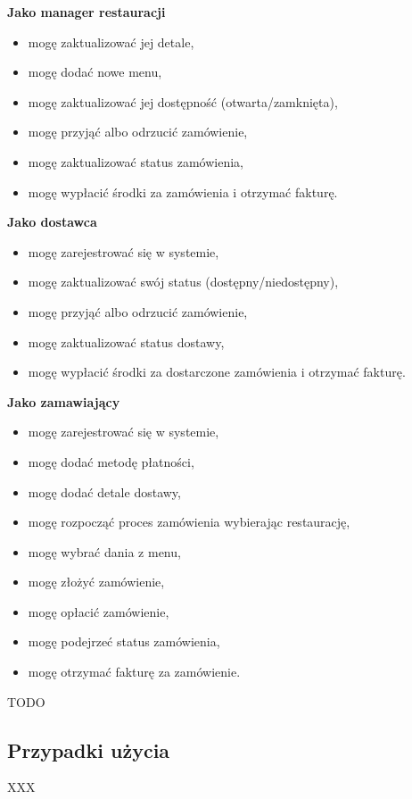 \textbf{Jako manager restauracji}
\begin{itemize}
    \item mogę zaktualizować jej detale,
    \item mogę dodać nowe menu,
    \item mogę zaktualizować jej dostępność (otwarta/zamknięta),
    \item mogę przyjąć albo odrzucić zamówienie,
    \item mogę zaktualizować status zamówienia,
    \item mogę wypłacić środki za zamówienia i otrzymać fakturę.
\end{itemize}

\textbf{Jako dostawca}
\begin{itemize}
    \item mogę zarejestrować się w systemie,
    \item mogę zaktualizować swój status (dostępny/niedostępny),
    \item mogę przyjąć albo odrzucić zamówienie,
    \item mogę zaktualizować status dostawy,
    \item mogę wypłacić środki za dostarczone zamówienia i otrzymać fakturę.
\end{itemize}

\textbf{Jako zamawiający}
\begin{itemize}
    \item mogę zarejestrować się w systemie,
    \item mogę dodać metodę płatności,
    \item mogę dodać detale dostawy,
    \item mogę rozpocząć proces zamówienia wybierając restaurację,
    \item mogę wybrać dania z menu,
    \item mogę złożyć zamówienie,
    \item mogę opłacić zamówienie,
    \item mogę podejrzeć status zamówienia,
    \item mogę otrzymać fakturę za zamówienie.
\end{itemize}

TODO

\subsection{Przypadki użycia}

XXX


